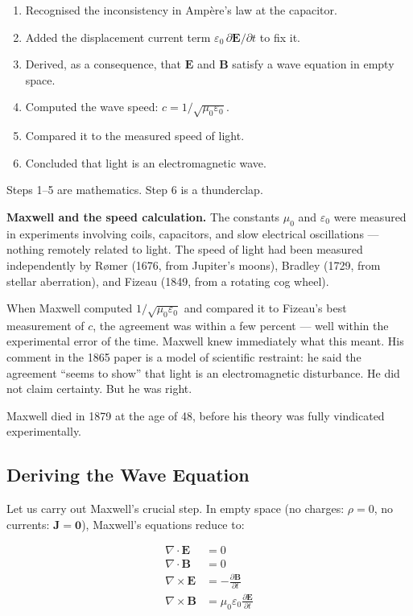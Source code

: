 \documentclass[12pt, a4paper, twoside]{book}
\theoremstyle{disc}
\begin{document}
\begin{enumerate}[leftmargin=2em, itemsep=3pt]
  \item Recognised the inconsistency in Amp\`ere's law at the capacitor.
  \item Added the displacement current term $\varepsilon_0\,\partial\bm{E}/\partial t$ to fix it.
  \item Derived, as a consequence, that $\bm{E}$ and $\bm{B}$ satisfy a wave equation in empty space.
  \item Computed the wave speed: $c = 1/\sqrt{\mu_0\varepsilon_0}$.
  \item Compared it to the measured speed of light.
  \item Concluded that light is an electromagnetic wave.
\end{enumerate}

Steps 1--5 are mathematics. Step 6 is a thunderclap.

\begin{historybox}
\textbf{Maxwell and the speed calculation.} The constants $\mu_0$ and $\varepsilon_0$ were measured in experiments involving coils, capacitors, and slow electrical oscillations --- nothing remotely related to light. The speed of light had been measured independently by R\o{}mer (1676, from Jupiter's moons), Bradley (1729, from stellar aberration), and Fizeau (1849, from a rotating cog wheel).

When Maxwell computed $1/\sqrt{\mu_0\varepsilon_0}$ and compared it to Fizeau's best measurement of $c$, the agreement was within a few percent --- well within the experimental error of the time. Maxwell knew immediately what this meant. His comment in the 1865 paper is a model of scientific restraint: he said the agreement ``seems to show'' that light is an electromagnetic disturbance. He did not claim certainty. But he was right.

Maxwell died in 1879 at the age of 48, before his theory was fully vindicated experimentally.
\end{historybox}

\subsection{Deriving the Wave Equation}

Let us carry out Maxwell's crucial step. In empty space (no charges: $\rho = 0$, no currents: $\bm{J} = \bm{0}$), Maxwell's equations reduce to:

\begin{align}
  \nabla\cdot\bm{E} &= 0 \label{eq:div_E}\\
  \nabla\cdot\bm{B} &= 0 \label{eq:div_B}\\
  \nabla\times\bm{E} &= -\frac{\partial\bm{B}}{\partial t} \label{eq:curl_E}\\
  \nabla\times\bm{B} &= \mu_0\varepsilon_0\frac{\partial\bm{E}}{\partial t} \label{eq:curl_B}
\end{align}
\end{document}
